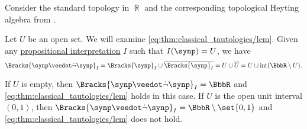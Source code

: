 \begin{example}\label{ex:topological_semantics_lem_counterexample}
  Consider the standard topology in \( \BbbR \) and the corresponding topological Heyting algebra from .

  Let \( U \) be an open set. We will examine \eqref{eq:thm:classical_tautologies/lem}. Given any \hyperref[def:propositional_valuation]{propositional interpretation} \( I \) such that \( I(\synp) = U \), we have
  \begin{equation*}
    \Bracks{\synp \synvee \synneg \synp}_I
    =
    \Bracks{\synp}_I \cup \oline{\Bracks{\synp}_I}
    =
    U \cup \oline{U}
    =
    U \cup \Int(\BbbR \setminus U).
  \end{equation*}

  If \( U \) is empty, then \( \Bracks{\synp \synvee \synneg \synp}_I = \BbbR \) and \eqref{eq:thm:classical_tautologies/lem} holds in this case. If \( U \) is the open unit interval \( (0, 1) \), then \( \Bracks{\synp \synvee \synneg \synp}_I = \BbbR \setminus \set{ 0, 1 } \) and \eqref{eq:thm:classical_tautologies/lem} does not hold.
\end{example}


